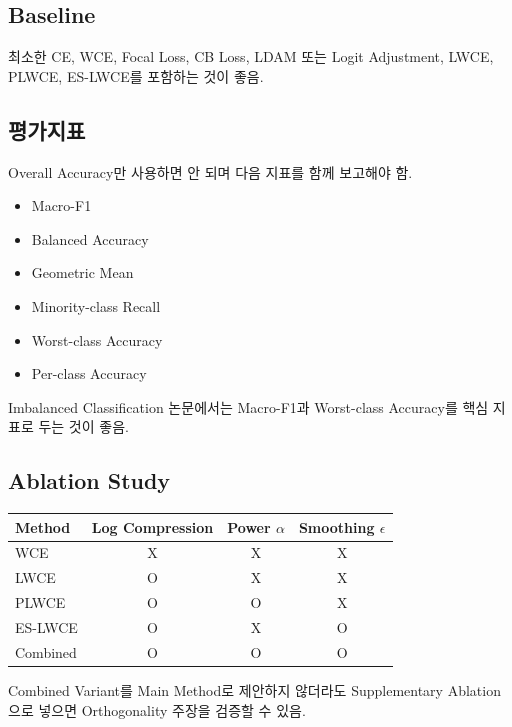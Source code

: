 \documentclass[11pt,a4paper]{article}
\begin{document}
\subsection{Baseline}

최소한 CE, WCE, Focal Loss, CB Loss, LDAM 또는 Logit Adjustment, LWCE, PLWCE, ES-LWCE를 포함하는 것이 좋음.

\subsection{평가지표}

Overall Accuracy만 사용하면 안 되며 다음 지표를 함께 보고해야 함.

\begin{itemize}
\item Macro-F1
\item Balanced Accuracy
\item Geometric Mean
\item Minority-class Recall
\item Worst-class Accuracy
\item Per-class Accuracy
\end{itemize}

\begin{tcolorbox}[title=핵심]
Imbalanced Classification 논문에서는 Macro-F1과 Worst-class Accuracy를 핵심 지표로 두는 것이 좋음.
\end{tcolorbox}

\subsection{Ablation Study}

\begin{center}
\begin{tabular}{lccc}
\toprule
Method & Log Compression & Power \(\alpha\) & Smoothing \(\epsilon\) \\
\midrule
WCE & X & X & X \\
LWCE & O & X & X \\
PLWCE & O & O & X \\
ES-LWCE & O & X & O \\
Combined & O & O & O \\
\bottomrule
\end{tabular}
\end{center}

Combined Variant를 Main Method로 제안하지 않더라도 Supplementary Ablation으로 넣으면 Orthogonality 주장을 검증할 수 있음.
\end{document}
